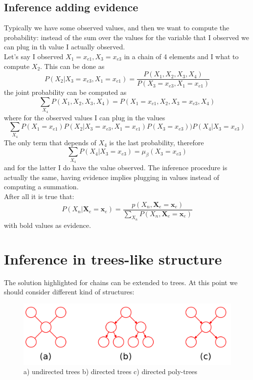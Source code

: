     \subsection{Inference adding evidence}
        Typically we have some observed values, and then we want to compute the probability: instead of the sum over the values for the variable that I observed we can plug in th value I actually observed.\\
        Let's say I observed $X_1 = x_{e1}, X_3 = x_{e3}$ in a chain of 4 elements and I what to compute $X_2$. This can be done as
        $$P(X_2|X_3 = x_{e3}, X_1 = x_{e1}) = \frac{P(X_1, X_2, X_3, X_4)}{P(X_3 = x_{e3}, X_1 = x_{e1})}$$
        the joint probability can be computed as
        $$\sum_{X_4} P(X_1, X_2, X_3, X_4) = P(X_1 = x_{e1}, X_2, X_3 = x_{e3}, X_4)$$ where for the observed values I can plug in the values
        $$\sum_{X_4} P(X_1 = x_{e1})P(X_2|X_3 = x_{e3}, X_1 = x_{e1})P(X_3 = x_{e3}))P(X_4|X_3 = x_{e3})$$
        The only term that depends of $X_4$ is the last probability, therefore
        $$\sum_{X_4} P(X_4|X_3 = x_{e3}) = \mu_\beta(X_3 = x_{e3})$$
        and for the latter I do have the value observed. 
        The inference procedure is actually the same, having evidence implies plugging in values instead of computing a summation.\\
        
        After all it is true that:
        \begin{equation}
            P(X_n|\textbf{X}_e = \textbf{x}_{e}) = \frac{p(X_n, \textbf{X}_e = \textbf{x}_{e})}{\sum_{X_n} P(X_n, \textbf{X}_e = \textbf{x}_e)}
        \end{equation}
        with bold values as evidence.
        
\section{Inference in trees-like structure}
    The solution highlighted for chains can be extended to trees. At this point we should consider different kind of structures:
    \begin{figure}
        \centering
        \includegraphics[scale=0.3]{images/trees_inferences.png}
        \caption{a) undirected trees b) directed trees c) directed poly-trees}
        \label{fig:trees_structure}
    \end{figure}
    
